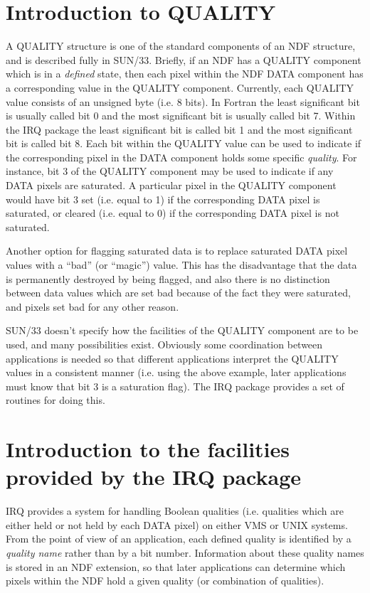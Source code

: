 \section {Introduction to QUALITY}
A QUALITY structure is one of the standard components of an NDF structure, and
is described fully in SUN/33. Briefly, if an NDF has a QUALITY component which
is in a {\em defined} state, then each pixel within the NDF DATA component has a
corresponding value in the QUALITY component. Currently, each QUALITY value
consists of an unsigned byte (i.e. 8 bits). In Fortran the least significant bit
is usually called bit 0 and the most significant bit is usually called bit 7.
Within the IRQ package the least significant bit is called bit 1 and the most
significant bit is called bit 8. Each bit within the QUALITY value can be used
to indicate if the corresponding pixel in the DATA component holds some specific
{\em quality}. For instance, bit 3 of the QUALITY component may be used to
indicate if any DATA pixels are saturated. A particular pixel in the QUALITY
component would have bit 3 set (i.e. equal to 1) if the corresponding DATA pixel
is saturated, or cleared (i.e. equal to 0) if the corresponding DATA pixel is
not saturated.

Another option for flagging saturated data is to replace saturated DATA pixel
values with a ``bad'' (or ``magic'') value. This has the disadvantage that the
data is permanently destroyed by being flagged, and also there is no distinction
between data values which are set bad because of the fact they were saturated,
and pixels set bad for any other reason.

SUN/33 doesn't specify how the facilities of the QUALITY component are to be
used, and many possibilities exist. Obviously some coordination between
applications is needed so that different applications interpret the QUALITY
values in a consistent manner (i.e. using the above example, later applications
must know that bit 3 is a saturation flag). The IRQ package provides a set of
routines for doing this.

\section {Introduction to the facilities provided by the IRQ package}
\label {SEC:IRQ}
IRQ provides a system for handling Boolean qualities (i.e. qualities which are
either held or not held by each DATA pixel) on either VMS or UNIX systems. From
the point of view of an application, each defined quality is identified by a
{\em quality name} rather than by a bit number. Information about these quality
names is stored in an NDF extension, so that later applications can determine
which pixels within the NDF hold a given quality (or combination of qualities).

